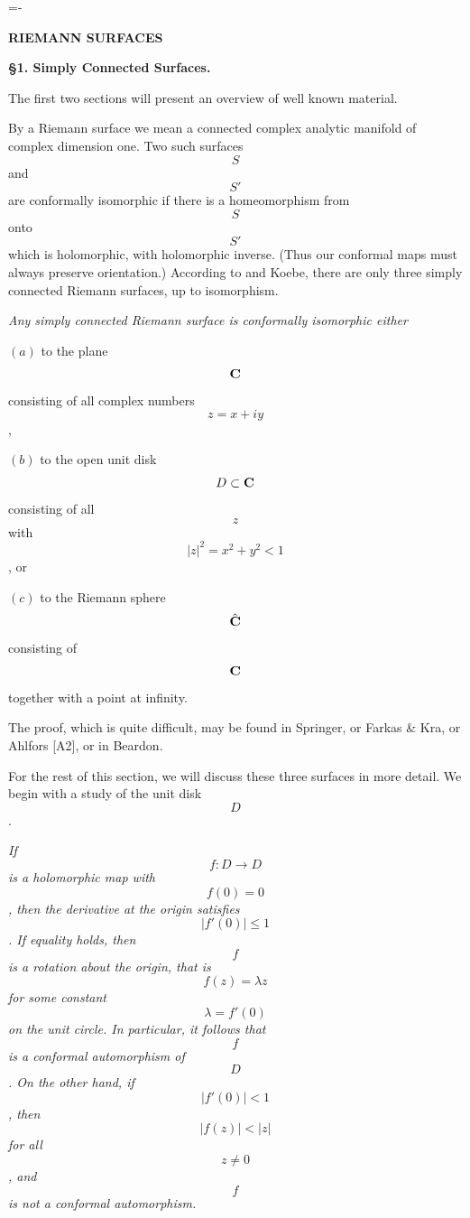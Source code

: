 
\eject
\footline={\hss{}-\folio\hss}


\centerline{\bf RIEMANN SURFACES}\medskip


\centerline{\bf \S1. Simply Connected Surfaces.}\medskip

The first two sections will present an overview of well known material.
\smallskip

By a {\bit Riemann surface} we mean a connected complex analytic manifold
of complex dimension one. Two such surfaces \[S\] and \[S'\] are
{\bit conformally isomorphic} if there is a homeomorphism
from \[S\] onto \[S'\] which is holomorphic, with holomorphic inverse.
(Thus our conformal maps must always preserve orientation.) According
to \Poincare and Koebe, there are only three simply connected Riemann surfaces,
up to isomorphism.

{ \it Any simply connected Riemann
surface is conformally isomorphic either

\noindent $(a)$ to the plane \[{\bf C}\]
consisting of all complex numbers \[z=x+iy\],

\noindent $(b)$ to the open unit disk
\[D\subset{\bf C}\] consisting of all \[z\] with \[|z|^2=x^2+y^2<1\], or

\noindent $(c)$ to the
Riemann sphere \[\hat{{\bf C}}\] consisting of \[{\bf C}\] together with a point at
infinity.\medskip}

The proof, which is quite difficult, may be found in Springer, or Farkas \&
Kra, or Ahlfors [A2], or in Beardon.\QED

For the rest of this section, we will discuss these three surfaces in more
detail. We begin with a study of the unit disk \[D\].

{ {\it If \[f:D\to D\] is a holomorphic map with
\[f(0)=0\], then the derivative at the origin satisfies \[|f'(0)|\le 1\].
If equality holds, then \[f\] is a rotation about the origin, that is
\[f(z)=\lambda z\] for some constant \[\lambda
=f'(0)\] on the unit circle. In particular,
it follows that \[f\] is a conformal automorphism of \[D\]. On the other
hand, if \[|f'(0)|<1\], then \[|f(z)|<|z|\] for all \[z\ne 0\], and
\[f\] is not a conformal automorphism.}\medskip}

